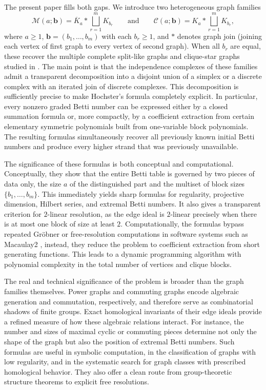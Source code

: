\documentclass[12pt]{article}
\theoremstyle{definition}
\theoremstyle{remark}
\newcommand{\MM}{\mathcal{M}}
\newcommand{\CC}{\mathcal{C}}
\newcommand{\bk}[1]{\mathbf{#1}}
\begin{document}
	The present paper fills both gaps. We introduce two heterogeneous graph families
	$$
	\MM(a;\bk{b})=\overline{K}_a * \bigsqcup_{r=1}^m K_{b_r}
	\qquad\text{and}\qquad
	\CC(a;\bk{b})=K_a * \bigsqcup_{r=1}^m K_{b_r},
	$$
	where $a\geq 1$, $\bk{b}=(b_1,\dots,b_m)$ with each $b_r\geq 1$, and $*$ denotes graph join (joining each vertex of first graph to every vertex of second graph). When all $b_r$ are equal, these recover the multiple complete split-like graphs and clique-star graphs studied in \cite{Rather2024}. The main point is that the independence complexes of these families admit a transparent decomposition into a disjoint union of a simplex or a discrete complex with an iterated join of discrete complexes. This decomposition is sufficiently precise to make Hochster's formula completely explicit. In particular, every nonzero graded Betti number can be expressed either by a closed summation formula or, more compactly, by a coefficient extraction from certain elementary symmetric polynomials built from one-variable block polynomials. The resulting formulas simultaneously recover all previously known initial Betti numbers and produce every higher strand that was previously unavailable.
	
	The significance of these formulas is both conceptual and computational. Conceptually, they show that the entire Betti table is governed by two pieces of data only, the size $a$ of the distinguished part and the multiset of block sizes $\{b_1,\dots,b_m\}$. This immediately yields sharp formulas for regularity, projective dimension, Hilbert series, and extremal Betti numbers. It also gives a transparent criterion for $2$-linear resolution, as the edge ideal is $2$-linear precisely when there is at most one block of size at least $2$. Computationally, the formulas bypass repeated Gröbner or free-resolution computations in software systems such as Macaulay2 \cite{GraysonStillman2002}, instead, they reduce the problem to coefficient extraction from short generating functions. This leads to a dynamic programming algorithm with polynomial complexity in the total number of vertices and clique blocks.
	
	The real and technical significance of the problem is broader than the graph families themselves. Power graphs and commuting graphs encode algebraic generation and commutation, respectively, and therefore serve as combinatorial shadows of finite groups. Exact homological invariants of their edge ideals provide a refined measure of how these algebraic relations interact. For instance, the number and sizes of maximal cyclic or commuting pieces determine not only the shape of the graph but also the position of extremal Betti numbers. Such formulas are useful in symbolic computation, in the classification of graphs with low regularity, and in the systematic search for graph classes with prescribed homological behavior. They also offer a clean route from group-theoretic structure theorems to explicit free resolutions.
	
\end{document}

